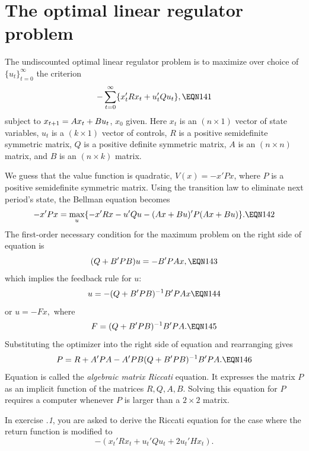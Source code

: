 \section{The optimal linear regulator problem}

The undiscounted optimal linear regulator problem
is to maximize over choice of $\{u_t\}_{t=0}^\infty$ the criterion
$$ - \sum_{t=0}^\infty \{x'_t Rx_t+u'_tQu_t\},\EQN 141$$
subject to $x_{{t+1}}=Ax_t+Bu_t$, $x_0$ given.  Here $x_t$ is an
$(n\times 1)$ vector of state variables, $u_t$ is a $(k\times 1)$
vector of controls, $R$ is a positive semidefinite symmetric matrix,
$Q$ is a positive definite symmetric matrix, $A$ is an $(n\times n)$
matrix, and $B$ is an $(n\times k)$ matrix.

We guess that the
value function is quadratic, $V(x)= - x'Px$, where $P$ is a positive
semidefinite symmetric matrix.
Using the transition law to eliminate next period's state, the Bellman
equation becomes
$$ - x'Px=\max_u \{- x' Rx-u'Qu-(Ax+Bu)' P(Ax+Bu)\}.\EQN 142$$
The first-order necessary condition for the maximum problem on the
right side of equation  is
$$(Q+B'PB)u=-B'PAx,\EQN 143$$
which implies the feedback rule for $u$:
$$u=-(Q+B'PB)^{-1} B'PAx\EQN 144$$
or
$u=-Fx,$
where $$F=(Q+B'PB)^{-1}B'PA. \EQN 145$$
  Substituting the optimizer  into
the right side of equation  and rearranging gives
$$P=R+A'PA-A'PB(Q+B'PB)^{-1} B'PA.\EQN 146$$
Equation  is called the {\it algebraic matrix Riccati} equation.
It expresses the matrix $P$ as an implicit function of the matrices
$R,Q,A,B$.  Solving this equation for $P$ requires
a computer whenever $P$ is larger than a $2 \times 2$ matrix.

In exercise {\it \the\chapternum.1\/}, you are asked to derive the Riccati
equation for the case where the return function is
modified to
$$ -(  x_t' R x_t + u_t' Q u_t  + 2 u_t' H x_t) .$$


%
%

